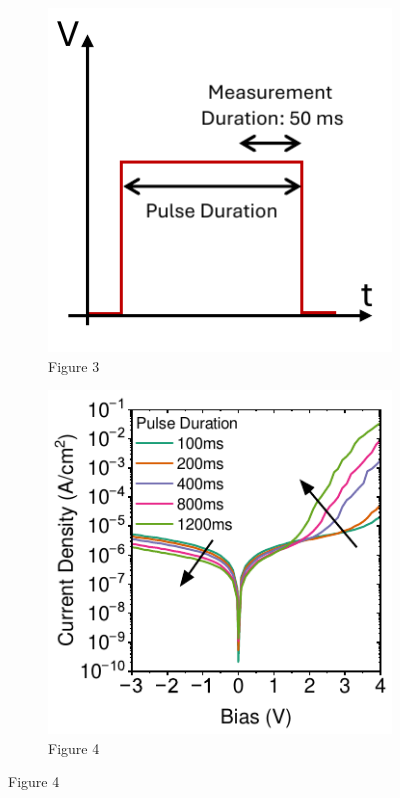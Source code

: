 \begin{figure}[htbp]
    \vspace{1em} %

    \begin{subfigure}[b]{0.35\textwidth}
        \centering
        \includegraphics[width=\textwidth]{chapters/material_properties/images/PAIOS_Pulsed_Measurement.pdf}
        \caption{Figure 3}
    \end{subfigure}
    \hfill
    \begin{subfigure}[b]{0.45\textwidth}
        \centering
        \includegraphics[width=\textwidth]{chapters/material_properties/images/Pulsed-PAIOS-plot.pdf}
        \caption{Figure 4}
    \end{subfigure}


\end{figure}
